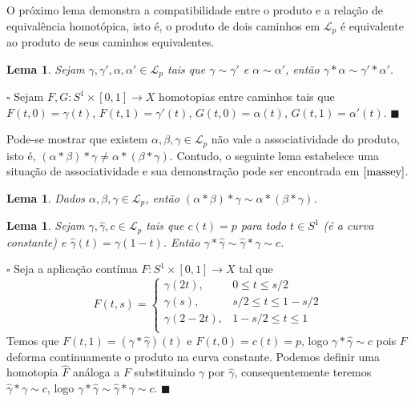 \documentclass[12pt]{book}
\newtheorem{lema}[teorema]{Lema}
\newenvironment{prova}[1]{$\square$ #1}{\hfill$\blacksquare$}
\newcommand{\caminhospontobase}[1]{\mathcal{L}_{#1}}
\newcommand{\circulo}{S^{1}}
\newcommand{\vermelho}[1]{{\color{red}#1}}
\begin{document}
	O próximo lema demonstra a compatibilidade entre o produto e a relação de equivalência homotópica, isto é, o produto de dois caminhos em $\caminhospontobase{p}$ é equivalente ao produto de seus caminhos equivalentes.
	
	\begin{lema}\label{lema_compatibilidade_produto_caminhos}
		Sejam $\gamma, \gamma', \alpha, \alpha' \in \caminhospontobase{p}$ tais que $\gamma \sim \gamma'$ e $\alpha \sim \alpha'$, então $\gamma * \alpha \sim \gamma' * \alpha'$.
	\end{lema}
	\begin{prova}
		\vermelho{
			Sejam  $F, G:\circulo \times [0,1] \to X$ homotopias entre caminhos tais que $F(t,0)=\gamma(t)$, $F(t,1)=\gamma'(t)$, $G(t,0)=\alpha(t)$, $G(t,1)=\alpha'(t)$.}
	\end{prova}
	
	Pode-se mostrar que existem $\alpha, \beta, \gamma \in \caminhospontobase{p}$ não vale a associatividade do produto, isto é, $(\alpha*\beta)*\gamma \neq \alpha*(\beta*\gamma)$. Contudo, o seguinte lema estabelece uma situação de associatividade e sua demonstração pode ser encontrada em $\cite{massey}$.
	
	\begin{lema}\label{lema_associatividade_produto_caminhos}
		Dados $\alpha, \beta, \gamma \in \caminhospontobase{p}$, então $(\alpha*\beta)*\gamma \sim \alpha*(\beta*\gamma)$.
	\end{lema}
	
	\begin{lema}\label{lema_caminho_inverso}
		Sejam $\gamma, \hat{\gamma}, c \in \caminhospontobase{p}$ tais que $c(t) = p$ para todo $t\in \circulo$ (é a curva constante) e $\hat{\gamma}(t) = \gamma(1-t)$. Então $\gamma*\hat{\gamma} \sim \hat{\gamma}*\gamma \sim c$.
	\end{lema} 	
	\begin{prova}
		Seja a aplicação contínua $F:\circulo\times [0,1]\to X$ tal que
		$$
			F(t,s) = 
			\left\{
			\begin{array}{cc}
				\gamma(2t), & 0\leq t \leq s/2\\
				\gamma(s), & s/2 \leq t \leq 1-s/2\\
				\gamma(2-2t), & 1-s/2 \leq t \leq 1\\
			\end{array}
			\right.
		$$
		Temos que $F(t,1) = (\gamma*\hat{\gamma})(t)$ e $F(t,0) = c(t) = p$, logo $\gamma*\hat{\gamma}\sim c$ pois $F$ deforma continuamente o produto na curva constante. Podemos definir uma homotopia $\hat{F}$ análoga a $F$ substituindo $\gamma$ por $\hat{\gamma}$, consequentemente teremos $\hat{\gamma}*\gamma \sim c$, logo $\gamma*\hat{\gamma} \sim \hat{\gamma}*\gamma \sim c$.
	\end{prova}
	
\end{document}
